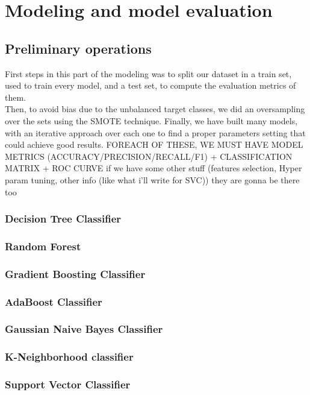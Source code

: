 \chapter{Modeling and model evaluation}
\label{sec:data_preparation}

\section{Preliminary operations}
First steps in this part of the modeling was to split our dataset in a train set, used to train every model, and a test set, to compute the evaluation metrics of them.\\
Then, to avoid bias due to the unbalanced target classes, we did an oversampling over the sets using the SMOTE technique.
Finally, we have built many models, with an iterative approach over each one to find a proper parameters setting that could achieve good results.
FOREACH OF THESE, WE MUST HAVE MODEL METRICS (ACCURACY/PRECISION/RECALL/F1) + CLASSIFICATION MATRIX + ROC CURVE if we have some other stuff (features selection, Hyper param tuning, other info (like what i'll write for SVC)) they are gonna be there too
\subsection{Decision Tree Classifier}
\subsection{Random Forest}
\subsection{Gradient Boosting Classifier}
\subsection{AdaBoost Classifier}
\subsection{Gaussian Naive Bayes Classifier}
\subsection{K-Neighborhood classifier}
\subsection{Support Vector Classifier}